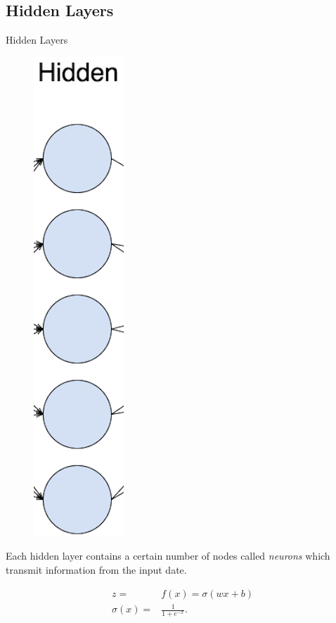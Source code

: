 \documentclass[mathserif]{beamer}
\begin{document}
\subsection{Hidden Layers}
\begin{frame}{Hidden Layers}
\begin{multicols}{2}
\begin{figure}[H]
\centering
\includegraphics[scale=0.3]{figures/hlayer.png}
\end{figure}
\columnbreak

Each hidden layer contains a certain number of nodes called \textit{neurons} which transmit information from the input date.

\begin{align*}
z=&f(x)=\sigma(wx+b)\\
\sigma(x)=&\frac{1}{1+e^{-x}}.
\end{align*}

\end{multicols}
\end{frame}
\end{document}
